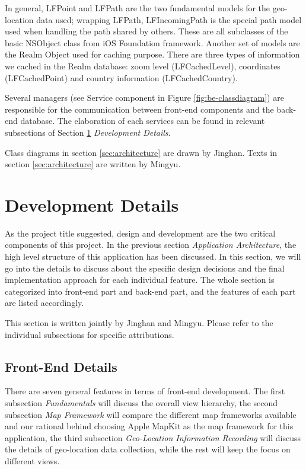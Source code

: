 \documentclass[12pt,a4paper]{article}
\renewcommand\texttt[1]{{\ttfamily\color{textttColor}#1}}
\begin{document}
        In general, \texttt{LFPoint} and \texttt{LFPath} are the two fundamental models for the geo-location data used; wrapping \texttt{LFPath}, \texttt{LFIncomingPath} is the special path model used when handling the path shared by others. These are all subclasses of the basic \texttt{NSObject} class from iOS Foundation framework. Another set of models are the Realm Object used for caching purpose. There are three types of information we cached in the Realm database: zoom level (\texttt{LFCachedLevel}), coordinates (\texttt{LFCachedPoint}) and country information (\texttt{LFCachedCountry}).
        
        Several managers (see Service component in Figure \ref{fig:be-classdiagram}) are responsible for the communication between front-end components and the back-end database. The elaboration of each services can be found in relevant subsections of Section \ref{development-details} \textit{Development Details}.
        
        \footnotesize
            Class diagrams in section \ref{sec:architecture} are drawn by Jinghan. Texts in section \ref{sec:architecture} are written by Mingyu.
        \normalsize
    \clearpage
    
    \section{Development Details}
    \label{development-details}
    
    As the project title suggested, design and development are the two critical components of this project. In the previous section \textit{Application Architecture}, the high level structure of this application has been discussed. In this section, we will go into the details to discuss about the specific design decisions and the final implementation approach for each individual feature. The whole section is categorized into front-end part and back-end part, and the features of each part are listed accordingly. 
    
    \footnotesize
    This section is written jointly by Jinghan and Mingyu. Please refer to the individual subsections for specific attributions.
    \normalsize
            
        \subsection{Front-End Details}
        There are seven general features in terms of front-end development. The first subsection \textit{Fundamentals} will discuss the overall view hierarchy, the second subsection \textit{Map Framework} will compare the different map frameworks available and our rational behind choosing Apple MapKit as the map framework for this application, the third subsection \textit{Geo-Location Information Recording} will discuss the details of geo-location data collection, while the rest will keep the focus on different views.
            
\end{document}
